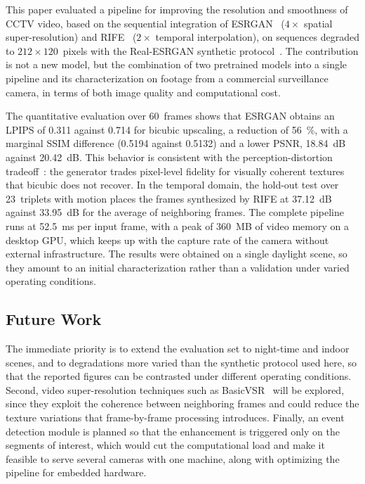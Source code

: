 \documentclass[conference]{IEEEtran}
\begin{document}
This paper evaluated a pipeline for improving the resolution and smoothness of CCTV video, based on the sequential integration of ESRGAN~\cite{wang2018esrgan} ($4\times$ spatial super-resolution) and RIFE~\cite{huang2022rife} ($2\times$ temporal interpolation), on sequences degraded to $212\times120$~pixels with the Real-ESRGAN synthetic protocol~\cite{wang2021realesrgan}. The contribution is not a new model, but the combination of two pretrained models into a single pipeline and its characterization on footage from a commercial surveillance camera, in terms of both image quality and computational cost.

The quantitative evaluation over 60~frames shows that ESRGAN obtains an LPIPS of 0.311 against 0.714 for bicubic upscaling, a reduction of 56~\%, with a marginal SSIM difference (0.5194 against 0.5132) and a lower PSNR, 18.84~dB against 20.42~dB. This behavior is consistent with the perception-distortion tradeoff~\cite{blau2018perception}: the generator trades pixel-level fidelity for visually coherent textures that bicubic does not recover. In the temporal domain, the hold-out test over 23~triplets with motion places the frames synthesized by RIFE at 37.12~dB against 33.95~dB for the average of neighboring frames. The complete pipeline runs at 52.5~ms per input frame, with a peak of 360~MB of video memory on a desktop GPU, which keeps up with the capture rate of the camera without external infrastructure. The results were obtained on a single daylight scene, so they amount to an initial characterization rather than a validation under varied operating conditions.

\subsection{Future Work}

The immediate priority is to extend the evaluation set to night-time and indoor scenes, and to degradations more varied than the synthetic protocol used here, so that the reported figures can be contrasted under different operating conditions. Second, video super-resolution techniques such as BasicVSR~\cite{chan2021basicvsr} will be explored, since they exploit the coherence between neighboring frames and could reduce the texture variations that frame-by-frame processing introduces. Finally, an event detection module is planned so that the enhancement is triggered only on the segments of interest, which would cut the computational load and make it feasible to serve several cameras with one machine, along with optimizing the pipeline for embedded hardware.



\end{document}
